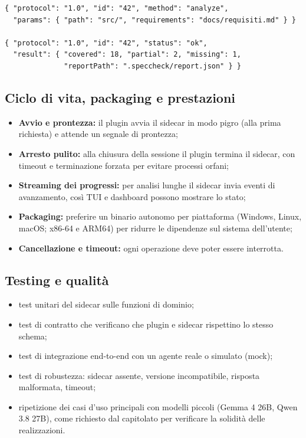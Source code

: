 \documentclass[a4paper, 11pt]{article}
\begin{document}
\begin{lstlisting}[caption={Esempio indicativo di richiesta e risposta del sidecar}]
{ "protocol": "1.0", "id": "42", "method": "analyze",
  "params": { "path": "src/", "requirements": "docs/requisiti.md" } }

{ "protocol": "1.0", "id": "42", "status": "ok",
  "result": { "covered": 18, "partial": 2, "missing": 1,
              "reportPath": ".speccheck/report.json" } }
\end{lstlisting}

\subsection{Ciclo di vita, packaging e prestazioni}
\begin{itemize}[noitemsep]
    \item \textbf{Avvio e prontezza:} il plugin avvia il sidecar in modo pigro (alla prima richiesta) e attende un segnale di prontezza;
    \item \textbf{Arresto pulito:} alla chiusura della sessione il plugin termina il sidecar, con timeout e terminazione forzata per evitare processi orfani;
    \item \textbf{Streaming dei progressi:} per analisi lunghe il sidecar invia eventi di avanzamento, così TUI e dashboard possono mostrare lo stato;
    \item \textbf{Packaging:} preferire un binario autonomo per piattaforma (Windows, Linux, macOS; x86-64 e ARM64) per ridurre le dipendenze sul sistema dell'utente;
    \item \textbf{Cancellazione e timeout:} ogni operazione deve poter essere interrotta.
\end{itemize}

\subsection{Testing e qualità}
\begin{itemize}[noitemsep]
    \item test unitari del sidecar sulle funzioni di dominio;
    \item test di contratto che verificano che plugin e sidecar rispettino lo stesso schema;
    \item test di integrazione end-to-end con un agente reale o simulato (mock);
    \item test di robustezza: sidecar assente, versione incompatibile, risposta malformata, timeout;
    \item ripetizione dei casi d'uso principali con modelli piccoli (Gemma 4 26B, Qwen 3.8 27B), come richiesto dal capitolato per verificare la solidità delle realizzazioni.
\end{itemize}
\end{document}
